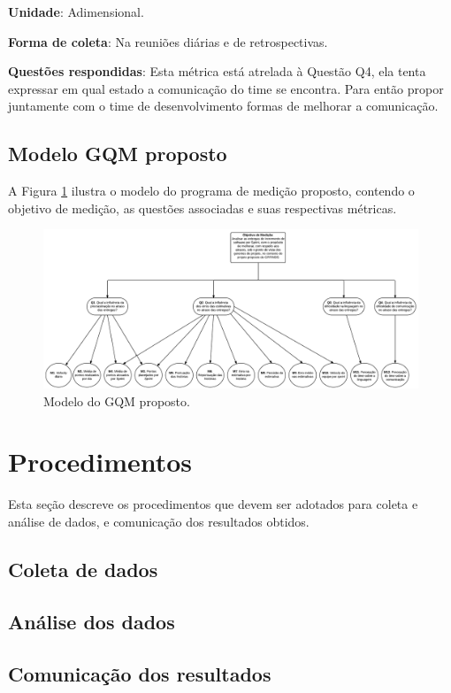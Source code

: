 \begin{itemize}
	   \subitem \textbf{Unidade}: Adimensional. 
	   
	   \subitem \textbf{Forma de coleta}: Na reuniões diárias e de retrospectivas.
	   
	   \subitem \textbf{Questões respondidas}: Esta métrica está atrelada à Questão Q4, ela tenta expressar em qual estado a comunicação do time se encontra. Para então propor juntamente com o time de desenvolvimento formas de melhorar a comunicação.
		    
	\end{itemize}
	
      \vfill
      \pagebreak
      \subsection{Modelo GQM proposto}
      
	A Figura \ref{gqm_proposto} ilustra o modelo do programa de medição proposto, contendo o objetivo de medição, as 
	questões associadas e suas respectivas métricas.
	
	\begin{figure}[!htb]
	  \centering
	  \includegraphics[scale=0.27, angle=90]{figuras/GQM}
	  \caption[Modelo do GQM proposto.]{Modelo do GQM proposto.}
	  \label{gqm_proposto}
	\end{figure}
      
    \section{Procedimentos}
      
      Esta seção descreve os procedimentos que devem ser adotados para coleta e análise de dados, e comunicação dos resultados obtidos.
      
      \subsection{Coleta de dados}
      
      \subsection{Análise dos dados}
      
      \subsection{Comunicação dos resultados}